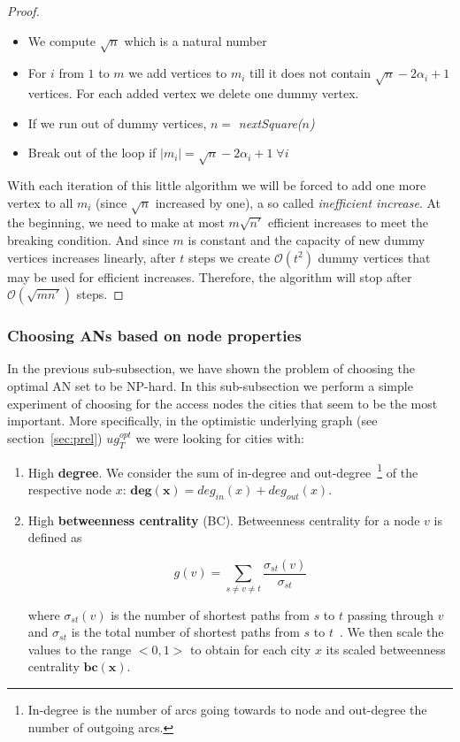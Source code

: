 \begin{proof}
			\begin{itemize}
				\item We compute $\sqrt{n}$ which is a natural number
				\item For $i$ from $1$ to $m$ we add vertices to $m_{i}$ till it does not contain $\sqrt{n} - 2\alpha_{i} + 1$ vertices. For each added vertex we delete one dummy vertex.
				\item If we run out of dummy vertices, $n =$ \textit{nextSquare($n$)}
				\item Break out of the loop if $|m_{i}| = \sqrt{n} - 2\alpha_{i} + 1 \; \forall i$
			\end{itemize}
			\hspace*{\fill}
			
			\noindent With each iteration of this little algorithm we will be forced to add one more vertex to all $m_{i}$ (since $\sqrt{n}$ increased by one), a so called \textit{inefficient increase}. At the beginning, we need to make at most $m\sqrt{n'}$ efficient increases to meet the breaking condition. And since $m$ is constant and the capacity of new dummy vertices increases linearly, after $t$ steps we create $\mathcal{O}(t^{2})$ dummy vertices that may be used for efficient increases. Therefore, the algorithm will stop after $\mathcal{O}(\sqrt{mn'})$ steps.
		\end{proof}
	
	\subsubsection{Choosing ANs based on node properties}
	
		In the previous sub-subsection, we have shown the problem of choosing the optimal AN set to be NP-hard. In this sub-subsection we perform a simple experiment of choosing for the access nodes the cities that seem to be the most important. More specifically, in the optimistic underlying graph (see section~\ref{sec:prel}) $ug_{T}^{opt}$ we were looking for cities with:
		\begin{enumerate}
			\item High \textbf{degree}. We consider the sum of in-degree and out-degree~\footnote{In-degree is the number of arcs going towards to node and out-degree the number of outgoing arcs.} of the respective node $x$: $\bm{deg(x)} = deg_{in}(x) + deg_{out}(x)$.
			\item High \textbf{betweenness centrality} (BC). Betweenness centrality for a node $v$ is defined as 
			
			$$g(v) = \sum_{s \neq v \neq t} \frac{\displaystyle \sigma_{st}(v)}{\displaystyle \sigma_{st}}$$
			
			where $\sigma_{st}(v)$ is the number of shortest paths from $s$ to $t$ passing through $v$ and $\sigma_{st}$ is the total number of shortest paths from $s$ to $t$~\cite{centrality01}. We then scale the values to the range $<0, 1>$ to obtain for each city $x$ its scaled betweenness centrality $\bm{bc(x)}$.
		\end{enumerate}
		\hspace*{\fill}
		

